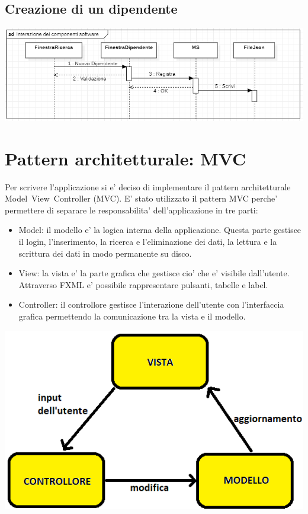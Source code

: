 \documentclass[ 4paper,11pt,openany]{book}
\begin{document}
\subsection{Creazione di un dipendente}
\includegraphics[width=180mm]{softwareseq2.png}

\section{Pattern architetturale: MVC}
Per scrivere l'applicazione si e' deciso di implementare il pattern architetturale Model~View~Controller (MVC).
E' stato utilizzato il pattern MVC perche' permettere di separare le responsabilita' dell'applicazione in tre parti:
\begin{itemize}
    \item Model: il modello e' la logica interna della applicazione. Questa parte gestisce il login, l'inserimento, la ricerca e l'eliminazione dei dati, la lettura e la scrittura dei dati in modo permanente su disco.
    \item View: la vista e' la parte grafica che gestisce cio' che e' visibile dall'utente. Attraverso FXML e' possibile rappresentare pulsanti, tabelle e label.
    \item Controller: il controllore gestisce l'interazione dell'utente con l'interfaccia grafica permettendo la comunicazione tra la vista e il modello.
\end{itemize}
\begin{center}
\includegraphics{mvc.png}
\end{center}
\end{document}
